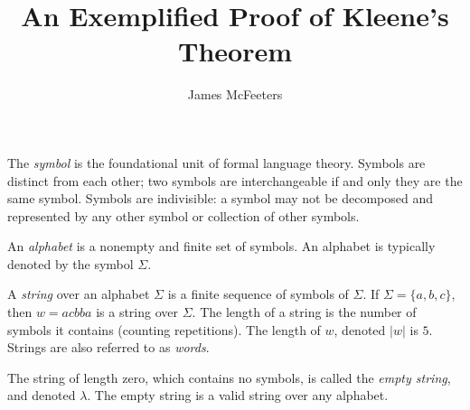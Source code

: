 \documentclass{bcthesis}
\title{An Exemplified Proof of Kleene's Theorem}
\author{James McFeeters}
\newif\ifbuildfrontmatter
\begin{document}
\ifbuildfrontmatter
\frontmatter

	\maketitle

	\begin{abstract}
		Your abstract goes here.
	\end{abstract}


	\begin{acknowledgments}
		Here you should acknowledge any special help on your project, or particular influences on your life or mathematical development.
	\end{acknowledgments}

	\tableofcontents
\fi

\mainmatter

\label{ch:basics}

		\begin{definition}[Symbol]
			The \textit{symbol} is the foundational unit of formal language theory.
			Symbols are distinct from each other; two symbols are interchangeable if and only they are the same symbol.
			Symbols are indivisible: a symbol may not be decomposed and represented by any other symbol or collection of other symbols.
		\end{definition}

		\begin{definition}[Alphabet]
			An \textit{alphabet} is a nonempty and finite set of symbols.
			An alphabet is typically denoted by the symbol $\Sigma$.
		\end{definition}

		\begin{definition}[String]
			A \textit{string} over an alphabet $\Sigma$ is a finite sequence of symbols of $\Sigma$.
			If $\Sigma = \{ a, b ,c \}$, then $w = acbba$ is a string over $\Sigma$.
			The length of a string is the number of symbols it contains (counting repetitions).
			The length of $w$, denoted $|w|$ is $5$.
			Strings are also referred to as \textit{words}.

			The string of length zero, which contains no symbols, is called the \textit{empty string}, and denoted $\lambda$.
			The empty string is a valid string over any alphabet.
		\end{definition}
\end{document}

